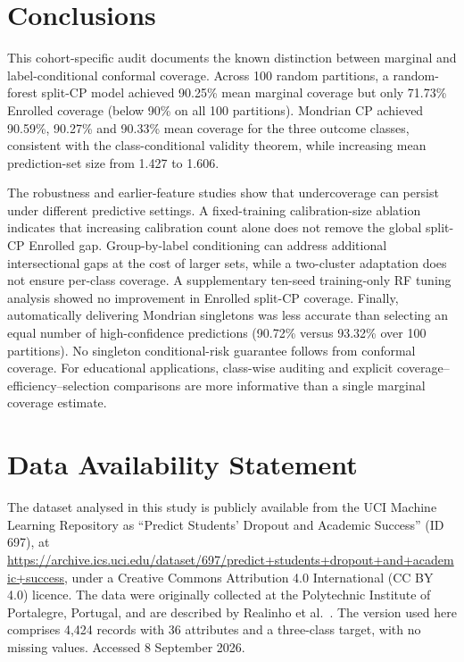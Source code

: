 \section{Conclusions}

This cohort-specific audit documents the known distinction between marginal
and label-conditional conformal coverage. Across 100 random partitions, a
random-forest split-CP model achieved 90.25\% mean marginal coverage but only
71.73\% Enrolled coverage (below 90\% on all 100 partitions). Mondrian CP
achieved 90.59\%, 90.27\% and 90.33\% mean coverage for the three outcome
classes, consistent with the class-conditional validity theorem, while
increasing mean prediction-set size from 1.427 to 1.606.

The robustness and earlier-feature studies show that undercoverage can persist
under different predictive settings. A fixed-training calibration-size ablation indicates that increasing
calibration count alone does not remove the global split-CP Enrolled gap.
Group-by-label conditioning can address additional intersectional gaps
at the cost of larger sets, while a two-cluster adaptation does not ensure
per-class coverage. A supplementary ten-seed training-only RF tuning analysis showed no
improvement in Enrolled split-CP coverage. Finally, automatically delivering Mondrian singletons was less accurate than
selecting an equal number of high-confidence predictions (90.72\% versus
93.32\% over 100 partitions). No singleton conditional-risk guarantee follows
from conformal coverage. For educational applications, class-wise auditing and
explicit coverage--efficiency--selection comparisons are more informative
than a single marginal coverage estimate.

\section*{Data Availability Statement}

The dataset analysed in this study is publicly available from the UCI Machine
Learning Repository as ``Predict Students' Dropout and Academic Success''
(ID 697), at
\url{https://archive.ics.uci.edu/dataset/697/predict+students+dropout+and+academic+success},
under a Creative Commons Attribution 4.0 International (CC BY 4.0) licence. The
data were originally collected at the Polytechnic Institute of Portalegre,
Portugal, and are described by Realinho et al.~\cite{realinho2022}. The version
used here comprises 4{,}424 records with 36 attributes and a three-class target,
with no missing values. Accessed 8 September 2026.

